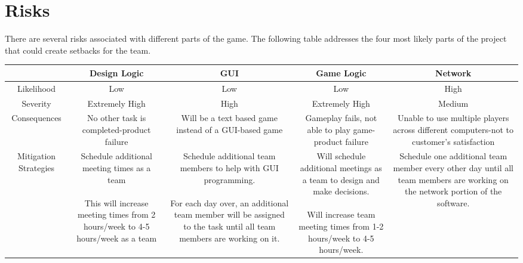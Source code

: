 \documentclass[11pt, titlepage]{article}
\begin{document}
    \section{Risks}

	    There are several risks associated with different parts of the game.  The following table addresses the four most likely parts of the project that could create setbacks for the team.

				\begin{tabular}{| c | c | c | c | c |}
					\hline
						&\parbox{3cm}{Design Logic}
						& \parbox{3cm}{GUI}
						& \parbox{3cm}{Game Logic}
						& \parbox{3cm}{Network} \\
					\hline	Likelihood
						& Low
						& Low
						& Low
						& High \\
					\hline Severity
						& Extremely High
						& High
						& Extremely High
						& Medium\\
					\hline Consequences
						& \parbox{3cm}{No other task is completed-product failure}
						& \parbox{3cm}{Will be a text based game instead of a GUI-based game}
						& \parbox{3cm}{Gameplay fails, not able to play game-product failure}
						& \parbox{3cm}{Unable to use multiple players across different computers-not to customer's satisfaction} \\
					\hline Mitigation Strategies
						& \parbox{3cm}{
									Schedule additional meeting times as a team
									\\ \\This will increase meeting times from 2 hours/week to 4-5 hours/week as a team
							}
						&  \parbox{3cm}{
									Schedule additional team members to help with GUI programming.
									\\ \\For each day over, an additional team member will be assigned to the task until all team members are working on it.
							}
						& \parbox{3cm}{
								Will schedule additional meetings as a team to design and make decisions.
								\\ \\Will increase team meeting times from 1-2 hours/week to 4-5 hours/week.
								}
						&\parbox{3cm}{Schedule one additional team member every other day until all team members are working on the network portion of the software.  }\\
					\hline
				\end{tabular}
\end{document}
